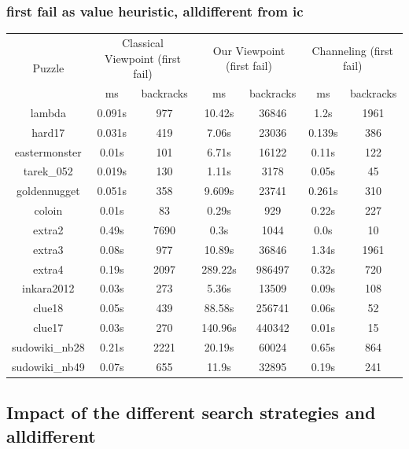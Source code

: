 \documentclass{report}
\begin{document}
\subsubsection{first fail as value heuristic, alldifferent from ic}
\begin{table}[h!]
  \begin{tabular}{|c|c|c|c|c|c|c|}
    \hline
    \multirow{2}{*}{Puzzle} &
      \multicolumn{2}{L|}{Classical Viewpoint (first fail)} &
      \multicolumn{2}{L|}{Our Viewpoint (first fail)} &
      \multicolumn{2}{L|}{ Channeling (first fail)} \\
    & ms & backracks & ms & backracks & ms & backracks \\
    \hline
lambda & 0.091s & 977 & 10.42s & 36846 & 1.2s & 1961\\
hard17 & 0.031s & 419 & 7.06s & 23036 & 0.139s & 386\\
eastermonster & 0.01s & 101 & 6.71s & 16122 & 0.11s & 122\\
tarek\_052 & 0.019s & 130 & 1.11s & 3178 & 0.05s & 45\\
goldennugget & 0.051s & 358 & 9.609s & 23741 & 0.261s & 310\\
coloin & 0.01s & 83 & 0.29s & 929 & 0.22s & 227\\
extra2 & 0.49s & 7690 & 0.3s & 1044 & 0.0s & 10\\
extra3 & 0.08s & 977 & 10.89s & 36846 & 1.34s & 1961\\
extra4 & 0.19s & 2097 & 289.22s & 986497 & 0.32s & 720\\
inkara2012 & 0.03s & 273 & 5.36s & 13509 & 0.09s & 108\\
clue18 & 0.05s & 439 & 88.58s & 256741 & 0.06s & 52\\
clue17 & 0.03s & 270 & 140.96s & 440342 & 0.01s & 15\\
sudowiki\_nb28 & 0.21s & 2221 & 20.19s & 60024 & 0.65s & 864\\
sudowiki\_nb49 & 0.07s & 655 & 11.9s & 32895 & 0.19s & 241\\
 \hline
  \end{tabular}
\end{table}
\newpage
\subsection{Impact of the different search strategies and alldifferent}
\end{document}
